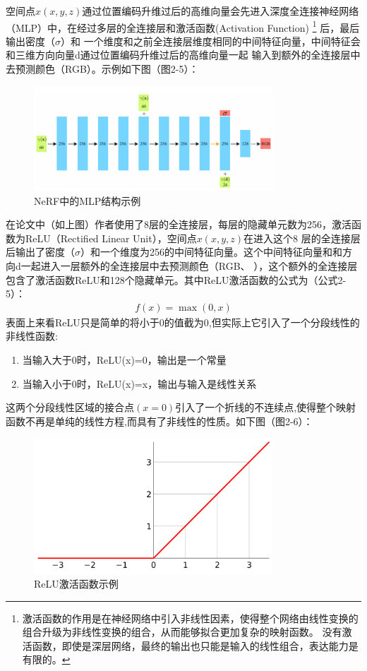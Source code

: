 \documentclass{nwputhesis}
\begin{document}
\indent
空间点$x(x,y,z)$通过位置编码升维过后的高维向量会先进入深度全连接神经网络（MLP）中，在经过多层的全连接层和激活函数(Activation Function)
\footnote{激活函数的作用是在神经网络中引入非线性因素，使得整个网络由线性变换的组合升级为非线性变换的组合，从而能够拟合更加复杂的映射函数。
没有激活函数，即使是深层网络，最终的输出也只能是输入的线性组合，表达能力是有限的。}
后，最后输出密度（$\sigma$）和 一个维度和之前全连接层维度相同的中间特征向量，中间特征会和三维方向向量d通过位置编码升维过后的高维向量一起
输入到额外的全连接层中去预测颜色（RGB）。示例如下图（图2-5）：
\hypertarget{图2-5}{}
\begin{figure}[H]
    \centering
    \includegraphics[width=0.8\textwidth]{picture/5.png}
    \caption{NeRF中的MLP结构示例}
\end{figure}
在论文中（如上图）作者使用了8层的全连接层，每层的隐藏单元数为256，激活函数为ReLU（Rectified Linear Unit），空间点$x(x,y,z)$在进入这个8
层的全连接层后输出了密度（$\sigma$）和一个维度为256的中间特征向量。这个中间特征向量和和方向d一起进入一层额外的全连接层中去预测颜色（RGB、
），这个额外的全连接层包含了激活函数ReLU和128个隐藏单元。其中ReLU激活函数的公式为（公式2-5）：
\begin{equation}
    \begin{aligned}
        f(x) = \max(0,x)
    \end{aligned}
\end{equation}
表面上来看ReLU只是简单的将小于0的值截为0,但实际上它引入了一个分段线性的非线性函数:
\begin{enumerate}
    \item 当输入大于0时，ReLU(x)=0，输出是一个常量
    \item 当输入小于0时，ReLU(x)=x，输出与输入是线性关系
\end{enumerate}
这两个分段线性区域的接合点$(x=0)$引入了一个折线的不连续点,使得整个映射函数不再是单纯的线性方程,而具有了非线性的性质。如下图（图2-6）：
\begin{figure}[H]
    \centering
    \includegraphics[width=0.8\textwidth]{picture/8.png}
    \caption{ReLU激活函数示例}
\end{figure}
\makespace
\hypertarget{section 2.3}{}
\end{document}
